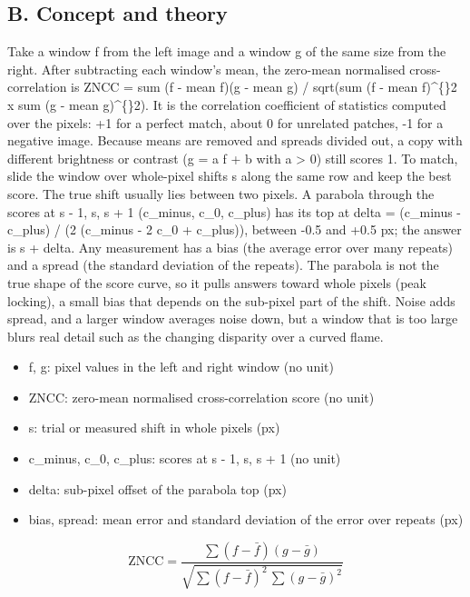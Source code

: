 \documentclass[11pt,a4paper]{article}
\begin{document}
\subsection*{B. Concept and theory}
Take a window f from the left image and a window g of the same size from the right. After subtracting each window's mean, the zero-mean normalised cross-correlation is ZNCC = sum (f - mean f)(g - mean g) / sqrt(sum (f - mean f)\textasciicircum\{\}2 x sum (g - mean g)\textasciicircum\{\}2). It is the correlation coefficient of statistics computed over the pixels: +1 for a perfect match, about 0 for unrelated patches, -1 for a negative image. Because means are removed and spreads divided out, a copy with different brightness or contrast (g = a f + b with a > 0) still scores 1. To match, slide the window over whole-pixel shifts s along the same row and keep the best score. The true shift usually lies between two pixels. A parabola through the scores at s - 1, s, s + 1 (c\_minus, c\_0, c\_plus) has its top at delta = (c\_minus - c\_plus) / (2 (c\_minus - 2 c\_0 + c\_plus)), between -0.5 and +0.5 px; the answer is s + delta. Any measurement has a bias (the average error over many repeats) and a spread (the standard deviation of the repeats). The parabola is not the true shape of the score curve, so it pulls answers toward whole pixels (peak locking), a small bias that depends on the sub-pixel part of the shift. Noise adds spread, and a larger window averages noise down, but a window that is too large blurs real detail such as the changing disparity over a curved flame.

\begin{itemize}[nosep]
\item f, g: pixel values in the left and right window (no unit)
\item ZNCC: zero-mean normalised cross-correlation score (no unit)
\item s: trial or measured shift in whole pixels (px)
\item c\_minus, c\_0, c\_plus: scores at s - 1, s, s + 1 (no unit)
\item delta: sub-pixel offset of the parabola top (px)
\item bias, spread: mean error and standard deviation of the error over repeats (px)
\end{itemize}

\begin{equation*}
\mathrm{ZNCC}=\frac{\sum (f-\bar f)(g-\bar g)}{\sqrt{\sum (f-\bar f)^2\,\sum (g-\bar g)^2}}
\end{equation*}
\end{document}
